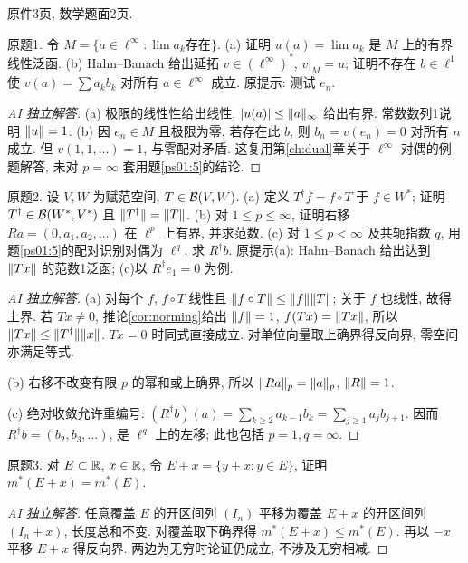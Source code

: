 \label{sec:ps03}
原件3页, 数学题面2页.
\begin{exercise}\label{ps03:1}
原题1. 令 $M=\{a\in\ell^\infty:\lim a_k\text{存在}\}$. (a) 证明 $u(a)=\lim a_k$ 是 $M$ 上的有界线性泛函. (b) Hahn--Banach 给出延拓 $v\in(\ell^\infty)^*$, $v|_M=u$; 证明不存在 $b\in\ell^1$ 使 $v(a)=\sum a_kb_k$ 对所有 $a\in\ell^\infty$ 成立. 原提示: 测试 $e_n$.
\end{exercise}
\begin{proof}[AI 独立解答]
(a) 极限的线性性给出线性, $|u(a)|\le\lVert a\rVert_\infty$ 给出有界. 常数数列1说明 $\lVert u\rVert=1$. (b) 因 $e_n\in M$ 且极限为零, 若存在此 $b$, 则 $b_n=v(e_n)=0$ 对所有 $n$ 成立. 但 $v(1,1,\ldots)=1$, 与零配对矛盾. 这复用第\ref{ch:dual}章关于 $\ell^\infty$ 对偶的例题解答, 未对 $p=\infty$ 套用题\ref{ps01:5}的结论.
\end{proof}
\begin{exercise}\label{ps03:2}
原题2. 设 $V,W$ 为赋范空间, $T\in\mathcal B(V,W)$. (a) 定义 $T^\dagger f=f\circ T$ 于 $f\in W^*$; 证明 $T^\dagger\in\mathcal B(W^*,V^*)$ 且 $\lVert T^\dagger\rVert=\lVert T\rVert$. (b) 对 $1\le p\le\infty$, 证明右移 $Ra=(0,a_1,a_2,\ldots)$ 在 $\ell^p$ 上有界, 并求范数. (c) 对 $1\le p<\infty$ 及共轭指数 $q$, 用题\ref{ps01:5}的配对识别对偶为 $\ell^q$, 求 $R^\dagger b$. 原提示(a): Hahn--Banach 给出达到 $\lVert Tx\rVert$ 的范数1泛函; (c)以 $R^\dagger e_1=0$ 为例.
\end{exercise}
\begin{proof}[AI 独立解答]
(a) 对每个 $f$, $f\circ T$ 线性且 $\lVert f\circ T\rVert\le\lVert f\rVert\lVert T\rVert$; 关于 $f$ 也线性, 故得上界. 若 $Tx\ne0$, 推论\ref{cor:norming}给出 $\lVert f\rVert=1$, $f(Tx)=\lVert Tx\rVert$, 所以 $\lVert Tx\rVert\le\lVert T^\dagger\rVert\lVert x\rVert$. $Tx=0$ 时同式直接成立. 对单位向量取上确界得反向界, 零空间亦满足等式.

(b) 右移不改变有限 $p$ 的幂和或上确界, 所以 $\lVert Ra\rVert_p=\lVert a\rVert_p$, $\lVert R\rVert=1$.

(c) 绝对收敛允许重编号: $(R^\dagger b)(a)=\sum_{k\ge2}a_{k-1}b_k=\sum_{j\ge1}a_jb_{j+1}$. 因而 $R^\dagger b=(b_2,b_3,\ldots)$, 是 $\ell^q$ 上的左移; 此也包括 $p=1,q=\infty$.
\end{proof}
\begin{exercise}\label{ps03:3}
原题3. 对 $E\subset\mathbb R$, $x\in\mathbb R$, 令 $E+x=\{y+x:y\in E\}$, 证明 $m^*(E+x)=m^*(E)$.
\end{exercise}
\begin{proof}[AI 独立解答]
任意覆盖 $E$ 的开区间列 $(I_n)$ 平移为覆盖 $E+x$ 的开区间列 $(I_n+x)$, 长度总和不变. 对覆盖取下确界得 $m^*(E+x)\le m^*(E)$. 再以 $-x$ 平移 $E+x$ 得反向界. 两边为无穷时论证仍成立, 不涉及无穷相减.
\end{proof}
